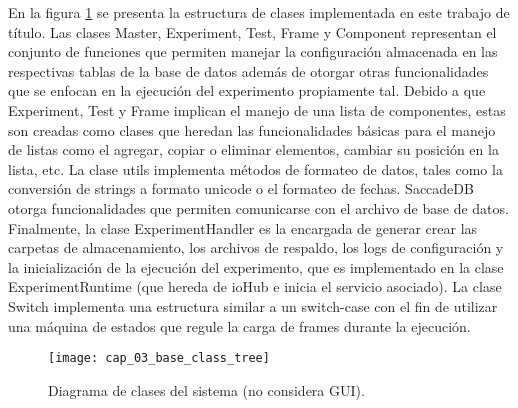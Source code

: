 \documentclass[\main/main.tex]{subfiles}
\begin{document}
			En la figura \ref{fig:03_base_class_tree} se presenta la estructura de clases implementada en este trabajo de título. Las clases Master, Experiment, Test, Frame y Component representan el conjunto de funciones que permiten manejar la configuración almacenada en las respectivas tablas de la base de datos además de otorgar otras funcionalidades que se enfocan en la ejecución del experimento propiamente tal. Debido a que Experiment, Test y Frame implican el manejo de una lista de componentes, estas son creadas como clases que heredan las funcionalidades básicas para el manejo de listas como el agregar, copiar o eliminar elementos, cambiar su posición en la lista, etc. La clase utils implementa métodos de formateo de datos, tales como la conversión de strings a formato unicode o el formateo de fechas. SaccadeDB otorga funcionalidades que permiten comunicarse con el archivo de base de datos. Finalmente, la clase ExperimentHandler es la encargada de generar crear las carpetas de almacenamiento, los archivos de respaldo, los logs de configuración y la inicialización de la ejecución del experimento, que es implementado en la clase ExperimentRuntime (que hereda de ioHub e inicia el servicio asociado). La clase Switch implementa una estructura similar a un switch-case con el fin de utilizar una máquina de estados que regule la carga de frames durante la ejecución.  
			\begin{figure}[H]
				\centering
				\texttt{[image: cap\_03\_base\_class\_tree]}
				\caption{Diagrama de clases del sistema (no considera GUI).}
				\label{fig:03_base_class_tree}
			\end{figure} 
\end{document}

